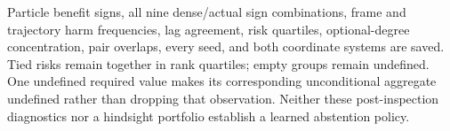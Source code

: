 Particle benefit signs, all nine dense/actual sign combinations, frame and
trajectory harm frequencies, lag agreement, risk quartiles, optional-degree
concentration, pair overlaps, every seed, and both coordinate systems are saved.
Tied risks remain together in rank quartiles; empty groups remain undefined.
One undefined required value makes its corresponding unconditional aggregate
undefined rather than dropping that observation. Neither these post-inspection
diagnostics nor a hindsight portfolio establish a learned abstention policy.
